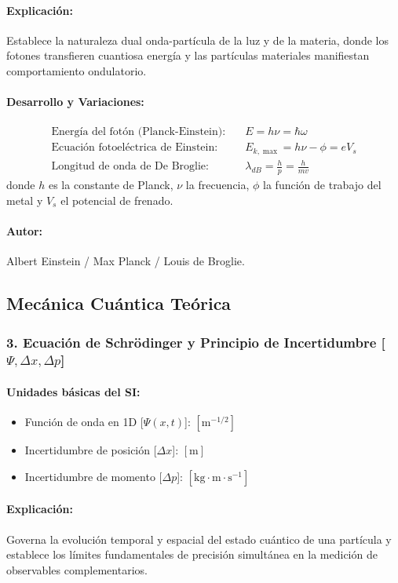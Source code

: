 \documentclass[12pt,a4paper]{article}
\begin{document}
\paragraph*{Explicación:} Establece la naturaleza dual onda-partícula de la luz y de la materia, donde los fotones transfieren cuantiosa energía y las partículas materiales manifiestan comportamiento ondulatorio.
\paragraph*{Desarrollo y Variaciones:}
\begin{align*}
\text{Energía del fotón (Planck-Einstein):} \quad & E = h \nu = \hbar \omega \\
\text{Ecuación fotoeléctrica de Einstein:} \quad & E_{k,\max} = h \nu - \phi = e V_s \\
\text{Longitud de onda de De Broglie:} \quad & \lambda_{dB} = \frac{h}{p} = \frac{h}{m v}
\end{align*}
donde $h$ es la constante de Planck, $\nu$ la frecuencia, $\phi$ la función de trabajo del metal y $V_s$ el potencial de frenado.
\paragraph*{Autor:} Albert Einstein / Max Planck / Louis de Broglie.

\subsection{Mecánica Cuántica Teórica}

\subsubsection*{3. Ecuación de Schrödinger y Principio de Incertidumbre [$\Psi, \Delta x, \Delta p$]}
\paragraph*{Unidades básicas del SI:}
\begin{itemize}
    \item Función de onda en 1D [$\Psi(x,t)$]: $[\text{m}^{-1/2}]$
    \item Incertidumbre de posición [$\Delta x$]: $[\text{m}]$
    \item Incertidumbre de momento [$\Delta p$]: $[\text{kg}\cdot\text{m}\cdot\text{s}^{-1}]$
\end{itemize}
\paragraph*{Explicación:} Governa la evolución temporal y espacial del estado cuántico de una partícula y establece los límites fundamentales de precisión simultánea en la medición de observables complementarios.
\end{document}
